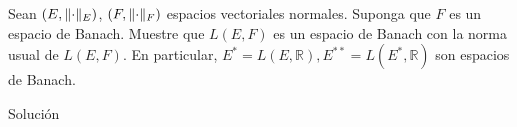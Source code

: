 \begin{homeworkProblem}
  Sean $(E,\lVert\cdot\rVert_{E})$, $(F,\lVert\cdot\rVert_{F})$ espacios vectoriales normales. Suponga que $F$ es un espacio de Banach. Muestre que $L(E,F)$ es un espacio de Banach con la norma usual de $L(E,F)$. En particular, $E^{*}=L(E,\mathbb{R}),E^{**}=L(E^{*},\mathbb{R})$ son espacios de Banach. 
  \begin{solution}
    Solución
  \end{solution}
\end{homeworkProblem}
